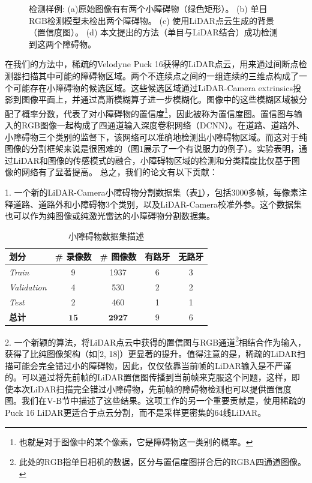 \documentclass[lang=cn,11pt]{elegantpaper}
\begin{document}
\begin{figure}[hp]
{\begin{minipage}[b]{.3\linewidth}
        \end{minipage}
    }
    \caption{检测样例: (a)原始图像有有两个小障碍物（绿色矩形）。 (b) 单目RGB检测模型未检出两个障碍物。 (c) 使用LiDAR点云生成的背景（置信度图）。 (d) 本文提出的方法（单目与LiDAR结合）成功检测到这两个障碍物。 \label{fig1}}%
\end{figure}

在我们的方法中，稀疏的Velodyne Puck 16获得的LiDAR点云，用来通过间断点检测器扫描其中可能的障碍物区域。两个不连续点之间的一组连续的三维点构成了一个可能存在小障碍物的候选区域。这些候选区域通过LiDAR-Camera extrinsics投影到图像平面上，并通过高斯模糊算子进一步模糊化。图像中的这些模糊区域被分配了概率分数，代表了对小障碍物的置信度\footnote{也就是对于图像中的某个像素，它是障碍物这一类别的概率。}，因此被称为置信度图。置信图与输入的RGB图像一起构成了四通道输入深度卷积网络（DCNN）。在道路、道路外、小障碍物三个类别的监督下，该网络可以准确地检测出小障碍物区域。而这对于纯图像的分割框架来说是很困难的（图1展示了一个有说服力的例子）。实验表明，通过LiDAR和图像的传感模式的融合，小障碍物区域的检测和分类精度比仅基于图像的网络有了显著提高。
总之，我们的论文有以下贡献：

1. 一个新的LiDAR-Camera小障碍物分割数据集（表\ref{tab:dataset}），包括3000多帧，每像素注释道路、道路外和小障碍物3个类别，以及LiDAR-Camera校准外参。这个数据集也可以作为纯图像或纯激光雷达的小障碍物分割数据集。  

\begin{table}[h]
\centering
\caption{小障碍物数据集描述}
\begin{tabular}{|l|c|c|c|c|}
\hline
\textbf{划分} & \textbf{\# 录像数} & \textbf{\# 图像数} & \textbf{有路牙} & \textbf{无路牙} \\

\hline\hline
     \textit{Train} & 9 & 1937 & 6 & 3\\
     \textit{Validation} & 4 & 530 & 2 & 2\\ 
     \textit{Test} & 2 & 460 & 1 & 1\\
     \hline\hline
     \textbf{总计} & $\mathbf{15}$ & $\mathbf{2927}$ & 9 & 6\\
\hline
\end{tabular}

\label{tab:dataset}
\end{table}

2. 一个新颖的算法，将LiDAR点云中获得的置信图与RGB通道\footnote{此处的RGB指单目相机的数据，区分与置信度图拼合后的RGBA四通道图像。}相结合作为输入，获得了比纯图像架构（如[2, 18]）更显著的提升。值得注意的是，稀疏的LiDAR扫描可能会完全错过小的障碍物，因此，仅仅依靠当前帧的LiDAR输入是不严谨的。可以通过将先前帧的LiDAR置信图传播到当前帧来克服这个问题，这样，即使本次LiDAR扫描完全错过小障碍物，先前帧的障碍物检测也可以提供置信度图。我们在V-B节中描述了这些结果。这项工作的另一个重要贡献是，使用稀疏的Puck 16 LiDAR更适合于点云分割，而不是采样更密集的64线LiDAR。
\end{document}
